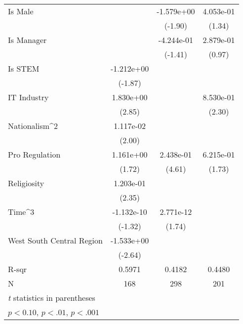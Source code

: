 {\begin{tabular}{l*{3}{c}}
    \addlinespace
    Is Male                   &                    & -1.579e+00\sym{*}  & 4.053e-01                \\
                              &                    & (-1.90)            & (1.34)                   \\
    \addlinespace
    Is Manager                &                    & -4.244e-01         & 2.879e-01                \\
                              &                    & (-1.41)            & (0.97)                   \\
    \addlinespace
    Is STEM                   & -1.212e+00\sym{*}  &                    &                          \\
                              & (-1.87)            &                    &                          \\
    \addlinespace
    IT Industry               & 1.830e+00\sym{**}  &                    & 8.530e-01\sym{*}         \\
                              & (2.85)             &                    & (2.30)                   \\
    \addlinespace
    Nationalism^2             & 1.117e-02\sym{*}   &                    &                          \\
                              & (2.00)             &                    &                          \\
    \addlinespace
    Pro Regulation            & 1.161e+00\sym{*}   & 2.438e-01\sym{***} & 6.215e-01\sym{*}         \\
                              & (1.72)             & (4.61)             & (1.73)                   \\
    \addlinespace
    Religiosity               & 1.203e-01\sym{*}   &                    &                          \\
                              & (2.35)             &                    &                          \\
    \addlinespace
    Time^3                    & -1.132e-10         & 2.771e-12\sym{*}   &                          \\
                              & (-1.32)            & (1.74)             &                          \\
    \addlinespace
    West South Central Region & -1.533e+00\sym{**} &                    &                          \\
                              & (-2.64)            &                    &                          \\
    \midrule
    R-sqr                     & 0.5971             & 0.4182             & 0.4480                   \\
    N                         & 168                & 298                & 201                      \\
    \bottomrule
    \multicolumn{4}{l}{\footnotesize \textit{t} statistics in parentheses}                         \\
    \multicolumn{4}{l}{\footnotesize \sym{*} \(p<0.10\), \sym{**} \(p<.01\), \sym{***} \(p<.001\)} \\
\end{tabular}
}
